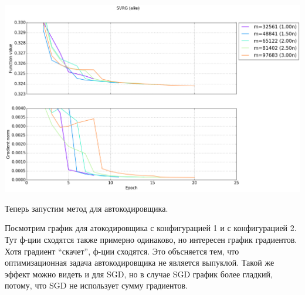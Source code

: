 \documentclass[12pt, a4paper]{article}
\begin{document}
    \begin{center}\includegraphics[width=\picwidth]{svrg_a9a_zoomed.png}\end{center}

    Теперь запустим метод для автокодировщика.

    Посмотрим график для атокодировщика с конфигурацией 1 и с конфигурацией 2. Тут ф-ции сходятся также примерно одинаково, но интересен график градиентов.
    Хотя градиент ``скачет'', ф-ции сходятся. Это объсняется тем, что оптимизационная задача автокодировщика не является выпуклой. Такой же эффект можно видеть и для SGD,
    но в случае SGD график более гладкий, потому, что SGD не использует сумму градиентов.
\end{document}
